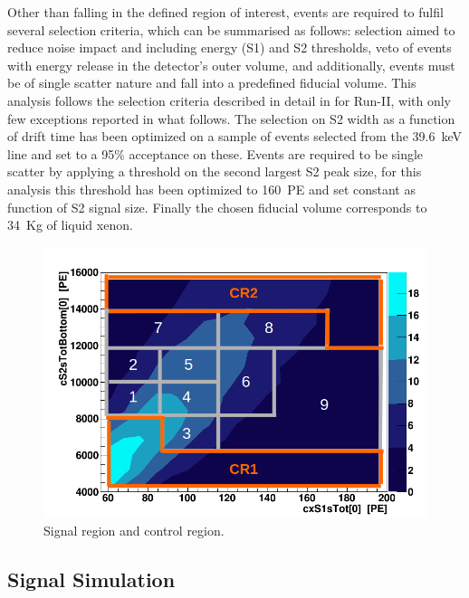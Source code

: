 Other than falling in the defined region of interest, events are required to fulfil several selection criteria, which can be summarised as follows:
selection aimed to reduce noise impact and including energy (S1) and S2 thresholds, veto of events with energy release in the detector's outer volume, 
and additionally, events must be of single scatter nature and fall into a predefined fiducial volume. This analysis follows the 
selection criteria described in detail in \cite{dataAnalysis} for Run-II, with only few exceptions reported in what follows. 
The selection on S2 width as a function of drift time has been optimized on a sample of events selected from the 39.6~keV line
and set to a 95\% acceptance on these. Events are required to be single scatter by applying a threshold on the 
second largest S2 peak size,  for this analysis this threshold has been optimized to 160~PE and set constant as function of S2 signal size. 
Finally the chosen fiducial volume corresponds to 34~Kg of liquid xenon.


\begin{figure}[t!]
  \includegraphics[width=\linewidth]{images/bkg_in_sr.png}
  \caption{Signal region and control region.}
  \label{fig:SR}
\end{figure}



\subsection{Signal Simulation} 

